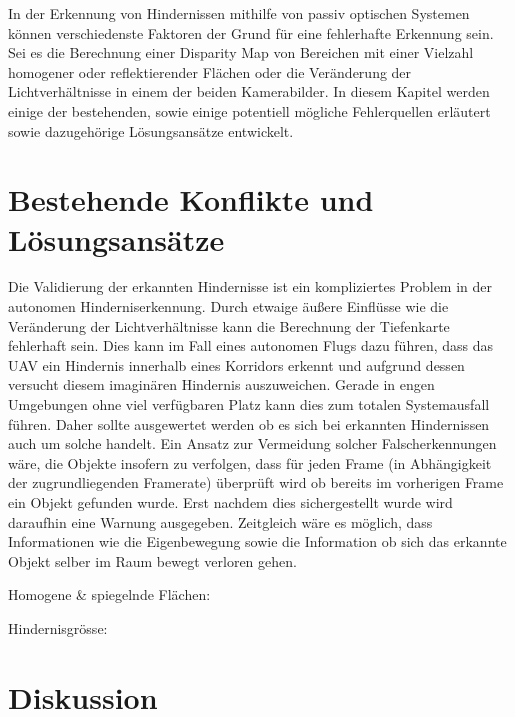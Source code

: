 In der Erkennung von Hindernissen mithilfe von passiv optischen Systemen können verschiedenste Faktoren der Grund für eine fehlerhafte Erkennung sein. Sei es die Berechnung einer Disparity Map von Bereichen mit einer Vielzahl homogener oder reflektierender Flächen oder die Veränderung der Lichtverhältnisse in einem der beiden Kamerabilder. In diesem Kapitel werden einige der bestehenden, sowie einige potentiell mögliche Fehlerquellen erläutert sowie dazugehörige Lösungsansätze entwickelt.\\


\section{Bestehende Konflikte und Lösungsansätze}
\label{sec:existing_conflicts}

Die Validierung der erkannten Hindernisse ist ein kompliziertes Problem in der autonomen Hinderniserkennung. Durch etwaige äußere Einflüsse wie die Veränderung der Lichtverhältnisse kann die Berechnung der Tiefenkarte fehlerhaft sein. Dies kann im Fall eines autonomen Flugs dazu führen, dass das UAV ein Hindernis innerhalb eines Korridors erkennt und aufgrund dessen versucht diesem imaginären Hindernis auszuweichen. Gerade in engen Umgebungen ohne viel verfügbaren Platz kann dies zum totalen Systemausfall führen. Daher sollte ausgewertet werden ob es sich bei erkannten Hindernissen auch um solche handelt. Ein Ansatz zur Vermeidung solcher Falscherkennungen wäre, die Objekte insofern zu verfolgen, dass für jeden Frame (in Abhängigkeit der zugrundliegenden Framerate) überprüft wird ob bereits im vorherigen Frame ein Objekt gefunden wurde. Erst nachdem dies sichergestellt wurde wird daraufhin eine Warnung ausgegeben. Zeitgleich wäre es möglich, dass Informationen wie die Eigenbewegung sowie die Information ob sich das erkannte Objekt selber im Raum bewegt verloren gehen.

Homogene \& spiegelnde Flächen:


Hindernisgrösse:



\section{Diskussion}
\label{sec:conflict_discussion}
